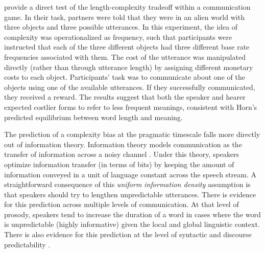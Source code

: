 \documentclass[man]{apa2}
\begin{document}
  provide a direct test of the length-complexity tradeoff within a communication game. In their task, partners were told that they were in an alien world with three objects and three possible utterances. In this experiment, the idea of complexity was operationalized as frequency, such that participants were instructed that each of the three different objects had three different base rate frequencies associated with them. The cost of the utterance was manipulated directly (rather than through utterance length) by assigning different monetary costs to each object. Participants' task was to communicate about one of the objects using one of the available utterances. If they successfully communicated, they received a reward. The results suggest that both the speaker and hearer expected costlier forms to refer to less frequent meanings, consistent with Horn's predicted equilibrium between word length and meaning.

The prediction of a complexity bias at the pragmatic timescale falls more directly out of information theory. Information theory models communication as the transfer of information across a noisy channel \cite{shannon1948}. Under this theory, speakers optimize information transfer (in terms of bits) by keeping the amount of information conveyed in a unit of language constant across the speech stream. A straightforward consequence of this {\it uniform information density} assumption is that speakers should try to lengthen unpredictable utterances. There is evidence for this prediction across multiple levels of communication. At that level of prosody, speakers tend to increase the duration of a word in cases where the word is unpredictable (highly informative) given the local \cite{aylett2004smooth} and global \cite{seyfarth2014word} linguistic context. There is also evidence for this prediction at the level of syntactic \cite{frank2008speaking} and discourse predictability \cite{genzel2002entropy}.
\end{document}
